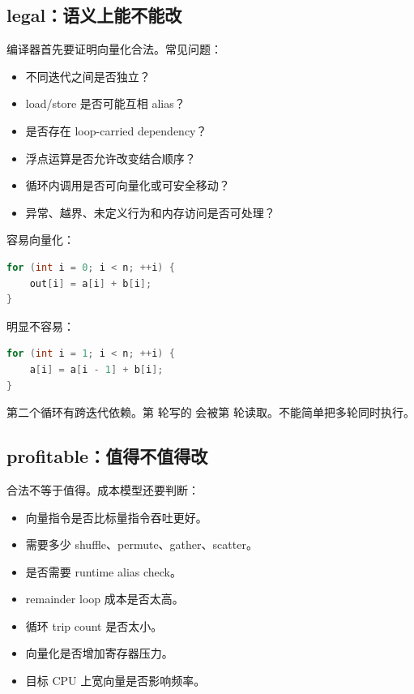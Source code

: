 \subsection{legal：语义上能不能改}

编译器首先要证明向量化合法。常见问题：

\begin{itemize}
  \item 不同迭代之间是否独立？
  \item load/store 是否可能互相 alias？
  \item 是否存在 loop-carried dependency？
  \item 浮点运算是否允许改变结合顺序？
  \item 循环内调用是否可向量化或可安全移动？
  \item 异常、越界、未定义行为和内存访问是否可处理？
\end{itemize}

容易向量化：

\begin{lstlisting}[language=C++]
for (int i = 0; i < n; ++i) {
    out[i] = a[i] + b[i];
}
\end{lstlisting}

明显不容易：

\begin{lstlisting}[language=C++]
for (int i = 1; i < n; ++i) {
    a[i] = a[i - 1] + b[i];
}
\end{lstlisting}

第二个循环有跨迭代依赖。第  轮写的  会被第  轮读取。不能简单把多轮同时执行。

\subsection{profitable：值得不值得改}

合法不等于值得。成本模型还要判断：

\begin{itemize}
  \item 向量指令是否比标量指令吞吐更好。
  \item 需要多少 shuffle、permute、gather、scatter。
  \item 是否需要 runtime alias check。
  \item remainder loop 成本是否太高。
  \item 循环 trip count 是否太小。
  \item 向量化是否增加寄存器压力。
  \item 目标 CPU 上宽向量是否影响频率。
\end{itemize}

